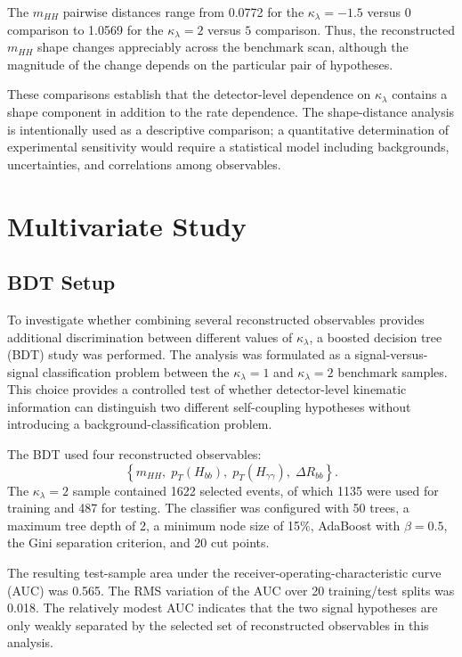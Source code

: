 \documentclass[11pt,a4paper]{article}
\begin{document}
The $m_{HH}$ pairwise distances range from 0.0772 for the $\kappa_\lambda=-1.5$ versus $0$ comparison to 1.0569 for the $\kappa_\lambda=2$ versus $5$ comparison. Thus, the reconstructed $m_{HH}$ shape changes appreciably across the benchmark scan, although the magnitude of the change depends on the particular pair of hypotheses.

These comparisons establish that the detector-level dependence on $\kappa_\lambda$ contains a shape component in addition to the rate dependence. The shape-distance analysis is intentionally used as a descriptive comparison; a quantitative determination of experimental sensitivity would require a statistical model including backgrounds, uncertainties, and correlations among observables.


\section{Multivariate Study}

\subsection{BDT Setup}

To investigate whether combining several reconstructed observables provides additional discrimination between different values of $\kappa_\lambda$, a boosted decision tree (BDT) study was performed. The analysis was formulated as a signal-versus-signal classification problem between the $\kappa_\lambda=1$ and $\kappa_\lambda=2$ benchmark samples. This choice provides a controlled test of whether detector-level kinematic information can distinguish two different self-coupling hypotheses without introducing a background-classification problem.

The BDT used four reconstructed observables:
\begin{equation}
\left\{m_{HH},\;p_T(H_{bb}),\;p_T(H_{\gamma\gamma}),\;\Delta R_{bb}\right\}.
\end{equation}
The $\kappa_\lambda=2$ sample contained 1622 selected events, of which 1135 were used for training and 487 for testing. The classifier was configured with 50 trees, a maximum tree depth of 2, a minimum node size of 15\%, AdaBoost with $\beta=0.5$, the Gini separation criterion, and 20 cut points.

The resulting test-sample area under the receiver-operating-characteristic curve (AUC) was 0.565. The RMS variation of the AUC over 20 training/test splits was 0.018. The relatively modest AUC indicates that the two signal hypotheses are only weakly separated by the selected set of reconstructed observables in this analysis.
\end{document}
